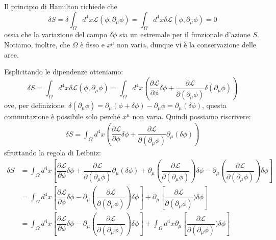 Il principio di Hamilton richiede che
\begin{equation}
    \delta S=\delta\int_{\Omega }d^4x\mathcal{L}\left(\phi,\partial_\mu\phi\right)=\int_{\Omega }d^4x\delta\mathcal{L}\left(\phi,\partial_\mu\phi\right)=0
\end{equation}
ossia che la variazione del campo $\delta\phi$ sia un estremale per il funzionale d'azione $S$.
Notiamo, inoltre, che $\Omega$ è fisso e $x^\mu$ non varia, dunque vi è la conservazione delle aree.

Esplicitando le dipendenze otteniamo:
\begin{equation}
    \delta S=\int_{\Omega }d^4x\delta\mathcal{L}\left(\phi,\partial_\mu\phi\right)=\int_{\Omega }d^4x\left(\dfrac{\partial\mathcal{L}}{\partial \phi}\delta\phi+\dfrac{\partial \mathcal{L}}{\partial(\partial_\mu\phi)}\delta(\partial_\mu\phi)\right)
\end{equation}
ove, per definizione: $\delta(\partial_\mu\phi)=\partial_\mu(\phi+\delta \phi)-\partial_\mu\phi=\partial_\mu(\delta\phi)$, questa commutazione è possibile solo perché $x^\mu$ non varia. Quindi possiamo riscrivere:
\begin{equation}
\begin{aligned}
    \delta S=\int_{\Omega }d^4x\left(\dfrac{\partial\mathcal{L}}{\partial \phi}\delta\phi+\dfrac{\partial \mathcal{L}}{\partial(\partial_\mu\phi)}\partial_\mu(\delta\phi)\right)
\end{aligned}
\end{equation}
sfruttando la regola di Leibniz:
\begin{equation}
\begin{aligned}
    \delta S&=\int_{\Omega }d^4x\left[\dfrac{\partial\mathcal{L}}{\partial \phi}\delta\phi+\dfrac{\partial \mathcal{L}}{\partial(\partial_\mu\phi)}\partial_\mu(\delta\phi)+\partial_\mu\left(\dfrac{\partial \mathcal{L}}{\partial(\partial_\mu\phi)}\right)\delta \phi-\partial_\mu\left(\dfrac{\partial \mathcal{L}}{\partial(\partial_\mu\phi)}\right)\delta \phi\right]\\
    &=\int_{\Omega }d^4x\left[\dfrac{\partial\mathcal{L}}{\partial \phi}\delta\phi-\partial_\mu\left(\dfrac{\partial \mathcal{L}}{\partial(\partial_\mu\phi)}\right)\delta \phi\right]+\partial_\mu\left[\dfrac{\partial \mathcal{L}}{\partial(\partial_\mu\phi)})\delta \phi\right]\\
    &=\int_{\Omega }d^4x\left[\dfrac{\partial\mathcal{L}}{\partial \phi}\delta\phi-\partial_\mu\left(\dfrac{\partial \mathcal{L}}{\partial(\partial_\mu\phi)}\right)\delta \phi\right]+\int_{\Omega }d^4x\partial_\mu\left[\dfrac{\partial \mathcal{L}}{\partial(\partial_\mu\phi)})\delta \phi\right]
\end{aligned}
\end{equation}
